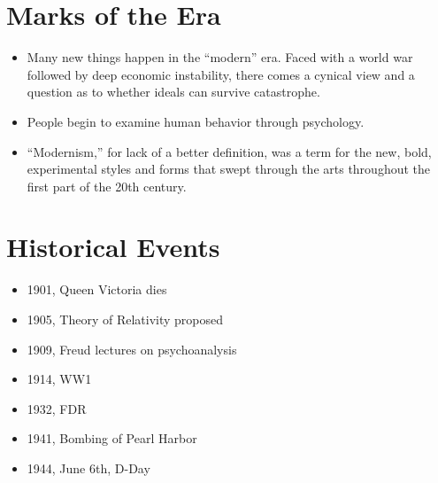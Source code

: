 \documentclass[10pt]{article}
\begin{document}
\section{Marks of the Era}
\begin{itemize}
	\item Many new things happen in the ``modern'' era.  Faced with a 
		world war followed by deep economic instability, there comes a 
		cynical view and a question as to whether ideals can survive 
		catastrophe.
	\item People begin to examine human behavior through psychology.
	\item ``Modernism,'' for lack of a better definition, was a term for 
		the new, bold, experimental styles and forms that swept 
		through the arts throughout the first part of the 20th century.
\end{itemize}

\section{Historical Events}
\begin{itemize}
	\item 1901, Queen Victoria dies
	\item 1905, Theory of Relativity proposed
	\item 1909, Freud lectures on psychoanalysis
	\item 1914, WW1
	\item 1932, FDR
	\item 1941, Bombing of Pearl Harbor
	\item 1944, June 6th, D-Day
\end{itemize}
\end{document}
